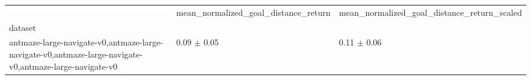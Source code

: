 \begin{tabular}{lll}
\toprule
 & mean_normalized_goal_distance_return & mean_normalized_goal_distance_return_scaled \\
dataset &  &  \\
\midrule
antmaze-large-navigate-v0,antmaze-large-navigate-v0,antmaze-large-navigate-v0,antmaze-large-navigate-v0 & 0.09 $\pm$ 0.05 & 0.11 $\pm$ 0.06 \\
\bottomrule
\end{tabular}
